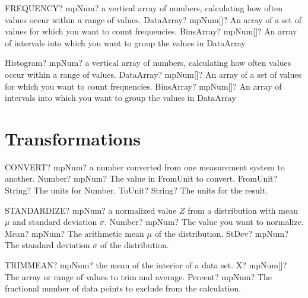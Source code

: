 \documentclass[12pt,a4paper,openany]{book}
\begin{document}
\begin{mpFunctionsExtract}
\mpWorksheetFunctionTwoNotImplemented
{FREQUENCY? mpNum? a vertical array of numbers, calculating how often values occur within a range of values.}
{DataArray? mpNum[]? An array of a set of values for which you want to count frequencies.}
{BinsArray? mpNum[]? An array of intervals into which you want to group the values in \textsf{DataArray}}
\end{mpFunctionsExtract}

\begin{mpFunctionsExtract}
\mpWorksheetFunctionTwoNotImplemented
{Histogram? mpNum? a vertical array of numbers, calculating how often values occur within a range of values.}
{DataArray? mpNum[]? An array of a set of values for which you want to count frequencies.}
{BinsArray? mpNum[]? An array of intervals into which you want to group the values in \textsf{DataArray}}
\end{mpFunctionsExtract}

\section{Transformations}

\begin{mpFunctionsExtract}
\mpWorksheetFunctionThreeNotImplemented
{CONVERT? mpNum? a number converted from one measurement system to another.}
{Number? mpNum? The value in \textsf{FromUnit} to convert.}
{FromUnit? String? The units for \textsf{Number}.}
{ToUnit? String? The units for the result.}
\end{mpFunctionsExtract}

\begin{mpFunctionsExtract}
\mpWorksheetFunctionThreeNotImplemented
{STANDARDIZE? mpNum? a normalized value  $Z$ from a distribution with mean $\mu$ and standard deviation $\sigma$.}
{Number? mpNum? The value you want to normalize.}
{Mean? mpNum? The arithmetic mean $\mu$ of the distribution.}
{StDev? mpNum? The standard deviation  $\sigma$ of the distribution.}
\end{mpFunctionsExtract}

\begin{mpFunctionsExtract}
\mpWorksheetFunctionTwoNotImplemented
{TRIMMEAN? mpNum? the mean of the interior of a data set.}
{X? mpNum[]? The array or range of values to trim and average.}
{Percent? mpNum? The fractional number of data points to exclude from the calculation.}
\end{mpFunctionsExtract}
\end{document}
